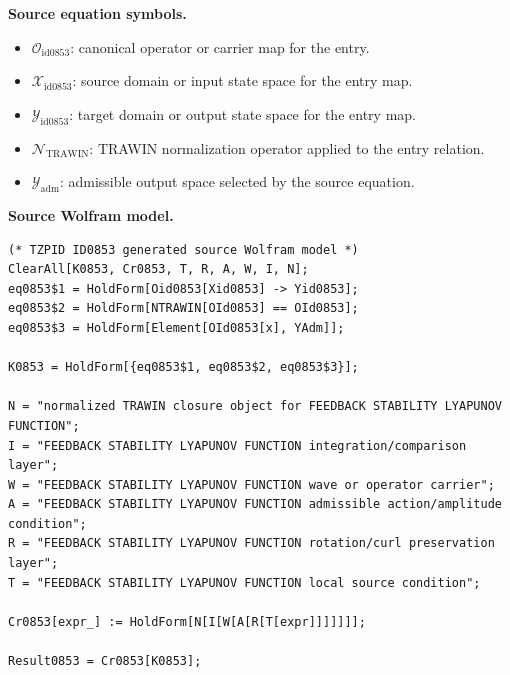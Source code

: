 \begin{minipage}[t]{0.49\linewidth}
\begingroup
\small
\raggedright
\textbf{Source equation symbols.}\par
\begin{itemize}[leftmargin=1.35em,itemsep=1pt,topsep=1pt,parsep=0pt]
    \item $\mathcal{O}_{\mathrm{id0853}}$: canonical operator or carrier map for the entry.
    \item $\mathcal{X}_{\mathrm{id0853}}$: source domain or input state space for the entry map.
    \item $\mathcal{Y}_{\mathrm{id0853}}$: target domain or output state space for the entry map.
    \item $\mathcal{N}_{\mathrm{TRAWIN}}$: TRAWIN normalization operator applied to the entry relation.
    \item $\mathcal{Y}_{\mathrm{adm}}$: admissible output space selected by the source equation.
\end{itemize}
\endgroup
\end{minipage}\hfill
\begin{minipage}[t]{0.47\linewidth}
\begingroup
\scriptsize
\raggedright
\textbf{Source Wolfram model.}\par
\begin{Verbatim}[fontsize=\tiny,breaklines=true,breakanywhere=true]
(* TZPID ID0853 generated source Wolfram model *)
ClearAll[K0853, Cr0853, T, R, A, W, I, N];
eq0853$1 = HoldForm[Oid0853[Xid0853] -> Yid0853];
eq0853$2 = HoldForm[NTRAWIN[OId0853] == OId0853];
eq0853$3 = HoldForm[Element[OId0853[x], YAdm]];

K0853 = HoldForm[{eq0853$1, eq0853$2, eq0853$3}];

N = "normalized TRAWIN closure object for FEEDBACK STABILITY LYAPUNOV FUNCTION";
I = "FEEDBACK STABILITY LYAPUNOV FUNCTION integration/comparison layer";
W = "FEEDBACK STABILITY LYAPUNOV FUNCTION wave or operator carrier";
A = "FEEDBACK STABILITY LYAPUNOV FUNCTION admissible action/amplitude condition";
R = "FEEDBACK STABILITY LYAPUNOV FUNCTION rotation/curl preservation layer";
T = "FEEDBACK STABILITY LYAPUNOV FUNCTION local source condition";

Cr0853[expr_] := HoldForm[N[I[W[A[R[T[expr]]]]]]];

Result0853 = Cr0853[K0853];
\end{Verbatim}
\endgroup
\end{minipage}

